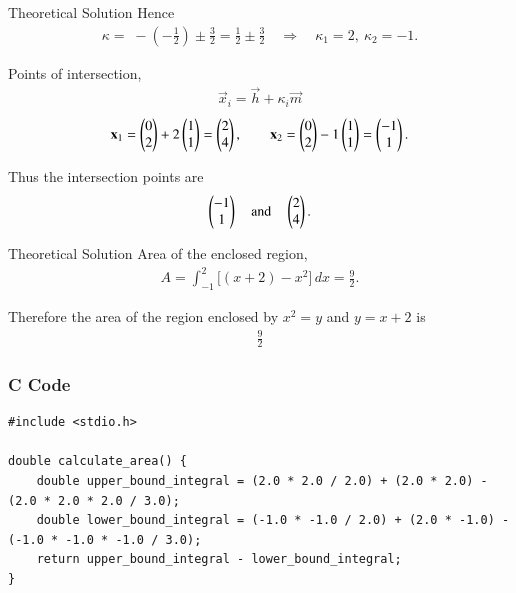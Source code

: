 \documentclass{beamer}
\begin{document}
\begin{frame}{Theoretical Solution}
Hence
\begin{align}
\kappa=\; -(-\tfrac{1}{2})\pm \tfrac{3}{2}
=\tfrac{1}{2}\pm \tfrac{3}{2}\quad\Longrightarrow\quad
\kappa_{1}=2,\ \kappa_{2}=-1.
\end{align}

Points of intersection,
\begin{align}
\vec{x}_{i}=\vec{h}+\kappa_{i}\vec{m}
\end{align}
\begin{align}
\mathbf{x}_{1}=\begin{pmatrix}0\\2\end{pmatrix}+2\begin{pmatrix}1\\1\end{pmatrix}=\begin{pmatrix}2\\4\end{pmatrix},\qquad
\mathbf{x}_{2}=\begin{pmatrix}0\\2\end{pmatrix}-1\begin{pmatrix}1\\1\end{pmatrix}=\begin{pmatrix}-1\\1\end{pmatrix}.
\end{align}

Thus the intersection points are 
\begin{align}
\begin{pmatrix}-1\\1\end{pmatrix} \quad \text{and} \quad \begin{pmatrix}2\\4\end{pmatrix}.
\end{align}

\end{frame}

\begin{frame}{Theoretical Solution}
Area of the enclosed region,
\begin{align}
A=\int_{-1}^{2}\big[(x+2)-x^{2}\big]\,dx
=\frac{9}{2}.
\end{align}

Therefore the area of the region enclosed by \(x^2=y\) and \(y=x+2\) is
\begin{align*}
\boxed{\tfrac{9}{2}}
\end{align*}
\end{frame}
\begin{frame}[fragile]
    \frametitle{C Code}

    \begin{lstlisting}
#include <stdio.h>

double calculate_area() {
    double upper_bound_integral = (2.0 * 2.0 / 2.0) + (2.0 * 2.0) - (2.0 * 2.0 * 2.0 / 3.0);
    double lower_bound_integral = (-1.0 * -1.0 / 2.0) + (2.0 * -1.0) - (-1.0 * -1.0 * -1.0 / 3.0);
    return upper_bound_integral - lower_bound_integral;
}
    \end{lstlisting}
\end{frame}
\end{document}
